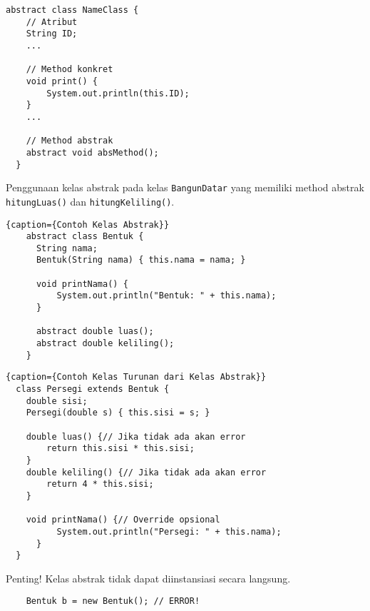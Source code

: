 \documentclass{../praktikum-ppt}
\begin{document}
\begin{frame}[fragile]{\insertsection}
  \begin{lstlisting}[caption={Syntax Kelas Abstrak}]
  abstract class NameClass {
    // Atribut
    String ID;
    ...

    // Method konkret
    void print() {
        System.out.println(this.ID);
    }
    ...

    // Method abstrak
    abstract void absMethod();
  }
  \end{lstlisting}
\end{frame}

\begin{frame}[fragile]{\insertsection}
  \begin{contoh}
    Penggunaan kelas abstrak pada kelas \texttt{BangunDatar} yang memiliki method abstrak \texttt{hitungLuas()} dan \texttt{hitungKeliling()}. 
  \end{contoh}
  \begin{lstlisting}{caption={Contoh Kelas Abstrak}}
    abstract class Bentuk {
      String nama;
      Bentuk(String nama) { this.nama = nama; }

      void printNama() {
          System.out.println("Bentuk: " + this.nama);
      }

      abstract double luas();
      abstract double keliling();
    }
  \end{lstlisting}
\end{frame}

\begin{frame}[fragile]{\insertsection}
  \begin{lstlisting}{caption={Contoh Kelas Turunan dari Kelas Abstrak}}
  class Persegi extends Bentuk {
    double sisi;
    Persegi(double s) { this.sisi = s; }

    double luas() {// Jika tidak ada akan error
        return this.sisi * this.sisi;
    }
    double keliling() {// Jika tidak ada akan error
        return 4 * this.sisi;
    }

    void printNama() {// Override opsional
          System.out.println("Persegi: " + this.nama);
      }
  }
  \end{lstlisting}
\end{frame}

\begin{frame}[fragile]{\insertsection}
  \begin{alertblock}{Penting!}
    Kelas abstrak tidak dapat diinstansiasi secara langsung. 
  \end{alertblock}
  \begin{lstlisting}
    Bentuk b = new Bentuk(); // ERROR!
  \end{lstlisting}
\end{frame}
\end{document}
